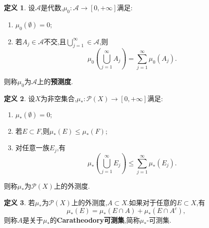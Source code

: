 \documentclass{ctexart}
\theoremstyle{definition}
\newtheorem{definition}{定义}
\theoremstyle{remark}
\begin{document}
	\begin{definition}
		设$\mathcal{A}$是代数,$\mu_0:\mathcal{A}\to[0,+\infty]$满足:
		\begin{enumerate}
			\item $\mu_0(\emptyset)=0$;
			\item 若$A_j\in\mathcal{A}$不交,且$\bigcup_{j=1}^\infty\in\mathcal{A}$,则
			$$\mu_0\left(\bigcup_{j=1}^\infty{A_j}\right)=\sum_{j=1}^\infty{\mu_0(A_j)}.$$
		\end{enumerate}
		则称$\mu_0$为$\mathcal{A}$上的\textbf{预测度}.
	\end{definition}
	
	\begin{definition}
		设$X$为非空集合,$\mu_*:\mathcal{P}(X)\to[0,+\infty]$满足:
		\begin{enumerate}
			\item $\mu_*(\emptyset)=0$;
			\item 若$E\subset F$,则$\mu_*(E)\le\mu_*(F)$;
			\item 对任意一族$E_j$,有
			$$\mu_*\left(\bigcup_{j=1}^\infty{E_j}\right)\le\sum_{j=1}^\infty{\mu_*(E_j)}.$$
		\end{enumerate}
		则称$\mu_*$为$\mathcal{P}(X)$上的外测度.
	\end{definition}
	
	\begin{definition}
		若$\mu_*$为$\mathcal{P}(X)$上的外测度,$A\subset X$.如果对于任意的$E\subset X$,有
		$$\mu_*(E)=\mu_*(E\cap A)+\mu_*(E\cap A^c),$$
		则称$A$是关于$\mu_*$的\textbf{Caratheodory可测集},简称$\mu_*$-可测集.
	\end{definition}
	
\end{document}
